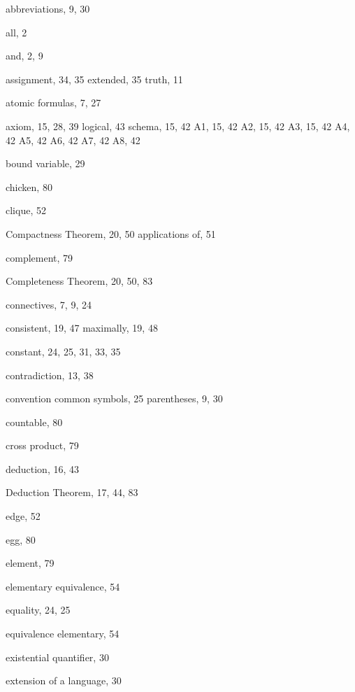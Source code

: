 \documentclass[12pt]{amsbook}
\theoremstyle{plain}
\theoremstyle{definition}
\theoremstyle{remark}
\begin{document}
\begin{theindex}
  \indexspace

  \item abbreviations, 9, 30
  \item all, 2
  \item and, 2, 9
  \item assignment, 34, 35
    \subitem extended, 35
    \subitem truth, 11
  \item atomic formulas, 7, 27
  \item axiom, 15, 28, 39
    \subitem logical, 43
    \subitem schema, 15, 42
      \subsubitem A1, 15, 42
      \subsubitem A2, 15, 42
      \subsubitem A3, 15, 42
      \subsubitem A4, 42
      \subsubitem A5, 42
      \subsubitem A6, 42
      \subsubitem A7, 42
      \subsubitem A8, 42

  \indexspace

  \item bound variable, 29

  \indexspace

  \item chicken, 80
  \item clique, 52
  \item Compactness Theorem, 20, 50
    \subitem applications of, 51
  \item complement, 79
  \item Completeness Theorem, 20, 50, 83
  \item connectives, 7, 9, 24
  \item consistent, 19, 47
    \subitem maximally, 19, 48
  \item constant, 24, 25, 31, 33, 35
  \item contradiction, 13, 38
  \item convention
    \subitem common symbols, 25
    \subitem parentheses, 9, 30
  \item countable, 80
  \item cross product, 79

  \indexspace

  \item deduction, 16, 43
  \item Deduction Theorem, 17, 44, 83

  \indexspace

  \item edge, 52
  \item egg, 80
  \item element, 79
  \item elementary equivalence, 54
  \item equality, 24, 25
  \item equivalence
    \subitem elementary, 54
  \item existential quantifier, 30
  \item extension of a language, 30


\end{theindex}
\end{document}
